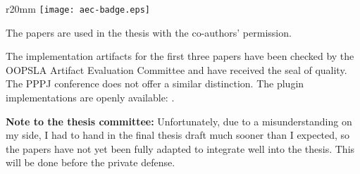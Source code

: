 \begin{wrapfigure}{r}{20mm}
  \vspace{0.7em}
  \centering
  \texttt{[image: aec-badge.eps]}
  \vspace{-4em}
\end{wrapfigure}

The papers are used in the thesis with the co-authors' permission.

The implementation artifacts for the first three papers have been checked by the OOPSLA Artifact Evaluation Committee and have received the seal of quality. The PPPJ conference does not offer a similar distinction.
The plugin implementations are openly available: \cite{miniboxing-www,ildl-plugin,ldl-staging-plugin,ldl-value-class-plugin,miniboxing-plugin}.


\textbf{Note to the thesis committee:} Unfortunately, due to a misunderstanding on my side, I had to hand in the final thesis draft much sooner than I expected, so the papers have not yet been fully adapted to integrate well into the thesis. This will be done before the private defense.